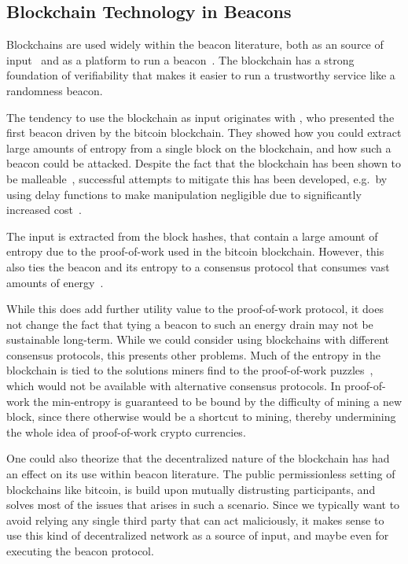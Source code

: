 \subsection{Blockchain Technology in Beacons}

Blockchains are used widely within the beacon literature, both as an source of input~\cite{bonneau2015bitcoin, bentov2016bitcoin, bunz2017proofsof} and as a platform to run a beacon~\cite{randao, bunz2017proofsof}.
The blockchain has a strong foundation of verifiability that makes it easier to run a trustworthy service like a randomness beacon.

The tendency to use the blockchain as input originates with \citet{bonneau2015bitcoin}, who presented the first beacon driven by the bitcoin blockchain.
They showed how you could extract large amounts of entropy from a single block on the blockchain, and how such a beacon could be attacked.
Despite the fact that the blockchain has been shown to be malleable~\cite{pierrot2016malleability}, successful attempts to mitigate this has been developed, e.g.\ by using delay functions to make manipulation negligible due to significantly increased cost~\cite{bunz2017proofsof}.

The input is extracted from the block hashes, that contain a large amount of entropy due to the proof-of-work used in the bitcoin blockchain.
However, this also ties the beacon and its entropy to a consensus protocol that consumes vast amounts of energy~\cite{bitcoinenergy}.

While this does add further utility value to the proof-of-work protocol, it does not change the fact that tying a beacon to such an energy drain may not be sustainable long-term.
While we could consider using blockchains with different consensus protocols, this presents other problems.
Much of the entropy in the blockchain is tied to the solutions miners find to the proof-of-work puzzles~\cite{bonneau2015bitcoin}, which would not be available with alternative consensus protocols.
In proof-of-work the min-entropy is guaranteed to be bound by the difficulty of mining a new block, since there otherwise would be a shortcut to mining, thereby undermining the whole idea of proof-of-work crypto currencies.

One could also theorize that the decentralized nature of the blockchain has had an effect on its use within beacon literature.
The public permissionless setting of blockchains like bitcoin, is build upon mutually distrusting participants, and solves most of the issues that arises in such a scenario.
Since we typically want to avoid relying any single third party that can act maliciously, it makes sense to use this kind of decentralized network as a source of input, and maybe even for executing the beacon protocol.


